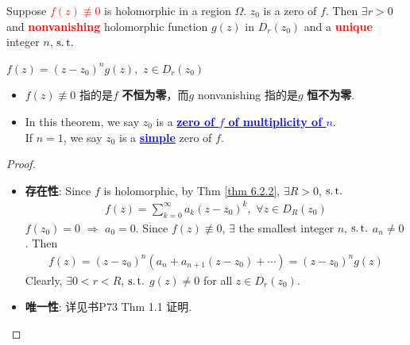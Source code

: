 	\begin{thm}\label{thm 7.1.1}
		Suppose \textcolor{red}{\textbf{$f(z) \not\equiv 0$}} is holomorphic in a region $\Omega$. $z_0$ is a zero of $f$. Then $\exists r > 0$ and \textcolor{red}{\textbf{nonvanishing}} holomorphic function $g(z)$ in $D_{r}(z_0)$ and a \textcolor{red}{\textbf{unique}} integer $n$, $\operatorname{s.t.}$
		\begin{center}
			$f(z) = (z - z_0)^n g(z) , \,\, z \in D_{r}(z_0)$
		\end{center}
	
		\vspace{1em}
		\begin{rmk}
			\begin{itemize}
				\item $f(z) \not\equiv 0$ 指的是$f$ \textbf{不恒为零}，而$g$ nonvanishing 指的是$g$ \textbf{恒不为零}.
				
				\item In this theorem, we say $z_0$ is a \underline{\textcolor{blue}{\textbf{zero of $f$ of multiplicity of $n$}}}. \\
				If $n = 1$, we say $z_0$ is a \underline{\textcolor{blue}{\textbf{simple}}} zero of $f$. 
			\end{itemize}
		\end{rmk}
	
		\vspace{1em}
		\begin{proof}
			\begin{itemize}
				\item \textbf{存在性}: Since $f$ is holomorphic, by Thm \ref{thm 6.2.2}, $\exists R > 0$, $\operatorname{s.t.}$
				\begin{align}
					f(z) = \sum_{k = 0}^{\infty}{a_k (z - z_0)^k} , \,\, \forall z \in D_{R}(z_0)
				\end{align}
				$f(z_0) = 0 \,\, \Rightarrow \,\, a_0 = 0$. Since $f(z) \not\equiv 0$, $\exists$ the smallest integer $n$, $\operatorname{s.t.}$ $a_n \neq 0$. Then
				\begin{align}
					f(z) = (z - z_0)^n (a_n + a_{n + 1}(z - z_0) + \cdots) = (z - z_0)^n g(z)
				\end{align}
				Clearly, $\exists 0 < r < R$, $\operatorname{s.t.}$ $g(z) \neq 0$ for all $z \in D_{r}(z_0)$.
				
				\item \textbf{唯一性}: 详见书P73 Thm 1.1 证明.
			\end{itemize}
		\end{proof}
	\end{thm}

